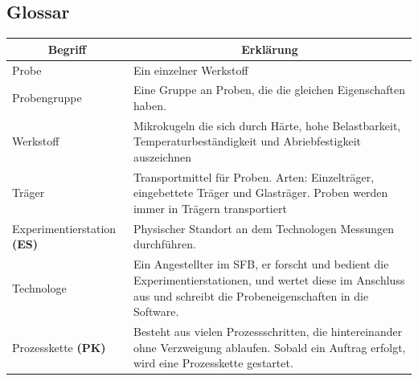 \documentclass[enabledeprecatedfontcommands,fontsize=12pt,paper=a4,twoside]{scrartcl}
\begin{document}
\subsection{Glossar}
\begin{longtable}[c]{|p{7cm}|p{8cm}|}
\hline
\multicolumn{1}{|c|}{\textbf{Begriff}}                          & \multicolumn{1}{c|}{\textbf{Erklärung}}                                                                                                                                                                                                               \\ \hline
\endhead
Probe                                                           & Ein einzelner Werkstoff                                                                                                                                                                                                                              \\ \hline
Probengruppe						& Eine Gruppe an Proben, die die gleichen Eigenschaften haben. \\ \hline
Werkstoff                                                       & Mikrokugeln die sich durch Härte, hohe Belastbarkeit, Temperaturbeständigkeit und Abriebfestigkeit auszeichnen                                                                                                                                     \\ \hline
Träger                                                          & Transportmittel für Proben. Arten: Einzelträger, eingebettete Träger und Glasträger. Proben werden immer in Trägern transportiert                                                                                                                     \\ \hline
Experimentierstation \textbf{(ES)}             & Physischer Standort an dem Technologen Messungen durchführen.                                                                                                                                                                                     \\ \hline
Technologe                                                      & Ein Angestellter im SFB, er forscht und bedient die Experimentierstationen, und wertet diese im Anschluss aus und schreibt die Probeneigenschaften in die Software.                                                                                                  \\ \hline
Prozesskette \textbf{(PK)}                       & Besteht aus vielen Prozessschritten, die hintereinander ohne Verzweigung ablaufen. Sobald ein Auftrag erfolgt, wird eine Prozesskette gestartet.                                                                                                        \\ \hline

\end{longtable}
\end{document}
